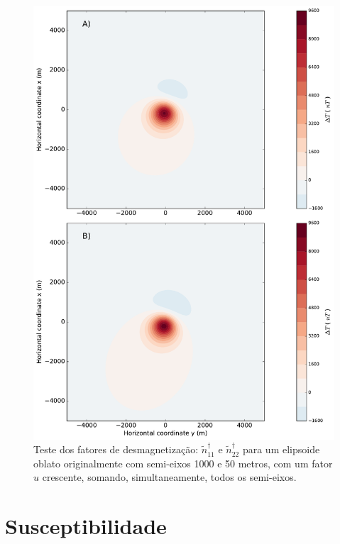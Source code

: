 \begin{figure}[hbt!]
	\centering \includegraphics[width=14 cm,height=21 cm]{figures/ellipsoid_triaxial_oblate}
	\caption[Comparação da anomalia de campo total aproximada entre um elipsoide triaxial com três semi-eixos muito próximos 
		e um elipsoide oblato.]{Teste dos fatores de desmagnetização:
		$\tilde{n}^{\dagger}_{11}$ e $\tilde{n}^{\dagger}_{22}$
		para um elipsoide oblato originalmente com semi-eixos 1000 e 50 metros, com um fator $u$ crescente,
		somando, simultaneamente, todos os semi-eixos.}
	\label{fig:triaxial_oblate}
\end{figure}

\section{Susceptibilidade}

